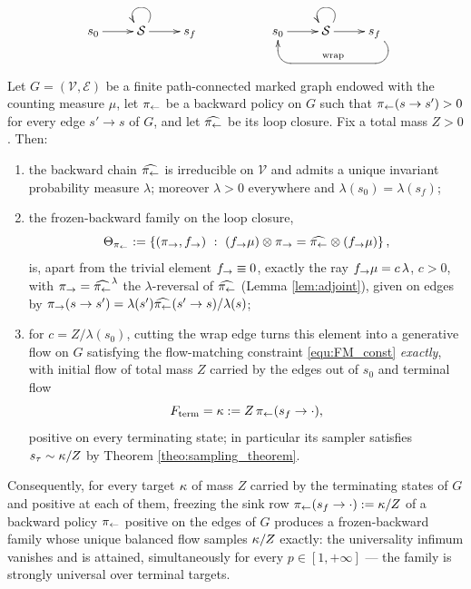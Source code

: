 \begin{equation}\label{eq:loop_closure}
        \xymatrix{
        s_0 \ar[r]&\Statespace \ar@(ur,ul)\ar[r] & s_f &&
        s_0 \ar[r]&\Statespace \ar@(ur,ul)\ar[r]& s_f \ar `dr_l[ll]`_u[ll]_{\mathrm{wrap}} [ll]
        }
\end{equation}

\begin{theorem}\label{theo:universality_graphs}
Let $G=(\mathcal V,\mathcal E)$ be a finite path-connected marked graph endowed with the counting measure $\mu$, let $\pi_{\leftarrow}$ be a backward policy on $G$ such that $\pi_{\leftarrow}(s\rightarrow s')>0$ for every edge $s'\rightarrow s$ of $G$, and let $\widehat{\pi_{\leftarrow}}$ be its loop closure. Fix a total mass $Z>0$. Then:
\begin{enumerate}
    \item the backward chain $\widehat{\pi_{\leftarrow}}$ is irreducible on $\mathcal V$ and admits a unique invariant probability measure $\lambda$; moreover $\lambda>0$ everywhere and $\lambda(s_0)=\lambda(s_f)$;
    \item the frozen-backward family on the loop closure,
    \begin{equation*}
        \Theta_{\BackwardPolicy}:=\left\{(\ForwardPolicy,\fout)\ :\ (\fout\mu)\otimes \ForwardPolicy = \widehat\BackwardPolicy\otimes(\fout\mu)\right\},
    \end{equation*}
    is, apart from the trivial element $f_{\rightarrow}\equiv0$, exactly the ray $f_{\rightarrow}\mu = c\,\lambda$, $c>0$, with $\pi_{\rightarrow}=\widehat{\pi_{\leftarrow}}^{\lambda}$ the $\lambda$-reversal of $\widehat{\pi_{\leftarrow}}$ (Lemma \ref{lem:adjoint}), given on edges by $\pi_{\rightarrow}(s\rightarrow s') = \lambda(s')\widehat{\pi_{\leftarrow}}(s'\rightarrow s)/\lambda(s)$;
    \item for $c=Z/\lambda(s_0)$, cutting the wrap edge turns this element into a generative flow on $G$ satisfying the flow-matching constraint \eqref{equ:FM_const} \emph{exactly}, with initial flow of total mass $Z$ carried by the edges out of $s_0$ and terminal flow
    \begin{equation*}
        F_{\mathrm{term}} = \kappa := Z\, \pi_{\leftarrow}(s_f\rightarrow\cdot),
    \end{equation*}
    positive on every terminating state; in particular its sampler satisfies $s_\tau\sim \kappa/Z$ by Theorem \ref{theo:sampling_theorem}.
\end{enumerate}
Consequently, for every target $\kappa$ of mass $Z$ carried by the terminating states of $G$ and positive at each of them, freezing the sink row $\pi_{\leftarrow}(s_f\rightarrow\cdot):=\kappa/Z$ of a backward policy $\pi_{\leftarrow}$ positive on the edges of $G$ produces a frozen-backward family whose unique balanced flow samples $\kappa/Z$ exactly: the universality infimum vanishes and is attained, simultaneously for every $p\in[1,+\infty]$ --- the family is strongly universal over terminal targets.
\end{theorem}


